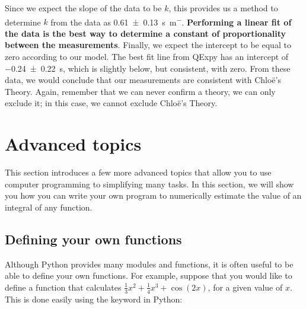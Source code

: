 Since we expect the slope of the data to be $k$, this provides us a method to determine $k$ from the data as \SI{0.61\pm 0.13}{s.m^{-}}. \textbf{Performing a linear fit of the data is the best way to determine a constant of proportionality between the measurements}. Finally, we expect the intercept to be equal to zero according to our model. The best fit line from QExpy has an intercept of \SI{-0.24\pm 0.22}{s}, which is slightly below, but consistent, with zero. From these data, we would conclude that our measurements are consistent with Chlo\"e's Theory. Again, remember that we can never confirm a theory, we can only exclude it; in this case, we cannot exclude Chlo\"e's Theory.

\section{Advanced topics}
This section introduces a few more advanced topics that allow you to use computer programming to simplifying many tasks. In this section, we will show you how you can write your own program to numerically estimate the value of an integral of any function.
\subsection{Defining your own functions}
Although Python provides many modules and functions, it is often useful to be able to define your own functions. For example, suppose that you would like to define a function that calculates $\frac{1}{3}x^2+\frac{1}{4}x^3+\cos(2x)$, for a given value of $x$. This is done easily using the  keyword in Python:

